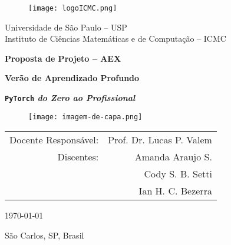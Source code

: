 \begin{titlepage}
    \clearpage\thispagestyle{empty}
	\centering

	\begin{figure}[ht]
		\centering
		\texttt{[image: logoICMC.png]}
	\end{figure}
	
	{\normalsize Universidade de São Paulo -- USP \\
		Instituto de Ciências Matemáticas e de Computação -- ICMC
		\par}
	\vspace*{2cm}
	
	{\Large\bfseries Proposta de Projeto -- AEX\par}
	\vspace*{8mm}
	{\Huge\bfseries Verão de Aprendizado Profundo \par}
	\vspace*{2mm}
	{\LARGE\bfseries \texttt{PyTorch} \emph{do Zero ao Profissional} \par}
	\vspace*{5mm}
	
    \begin{figure}[h!]
        \centering
        \texttt{[image: imagem-de-capa.png]}
    \end{figure}
	\vspace*{5mm}

	\begin{tabular}{rr}
        Docente Responsável: & Prof. Dr. Lucas P. Valem \\
        Discentes: & Amanda Araujo S. \\
		& Cody S. B. Setti \\
		& Ian H. C. Bezerra
	\end{tabular}
	\vspace*{1.25cm}
	   
	\vfill  %

	{\normalsize \today \par}
	\vspace*{2mm}
	{\normalsize São Carlos, SP, Brasil \par}
	\vspace*{2.5cm}
\end{titlepage}
